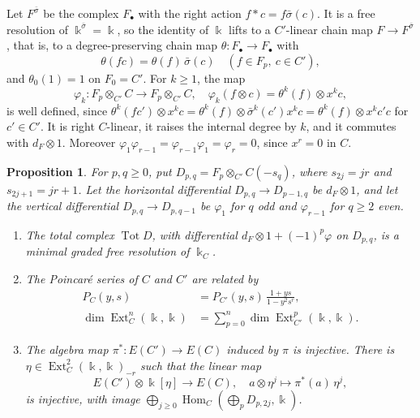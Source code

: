 \documentclass[reqno]{amsart}
\numberwithin{equation}{section}
\newtheorem{proposition}[equation]{Proposition}
\theoremstyle{definition}
\theoremstyle{remark}
\theoremstyle{plain}
\newcommand{\kk}{\Bbbk}
\DeclareMathOperator{\Ext}{Ext}
\DeclareMathOperator{\Hom}{Hom}
\DeclareMathOperator{\Tot}{Tot}
\begin{document}
Let $F^{\bar\sigma}$ be the complex $F_\bullet$ with the right action $f\ast c=f\bar\sigma(c)$. It is a free resolution of $\kk^{\bar\sigma}=\kk$, so the identity of $\kk$ lifts to a $C'$-linear chain map $F\to F^{\bar\sigma}$, that is, to a degree-preserving chain map $\theta\colon F_\bullet\to F_\bullet$ with
\begin{equation}\label{YAMe5Tr2}
\theta(fc)=\theta(f)\,\bar\sigma(c)\quad(f\in F_p,\ c\in C'),
\end{equation}
and $\theta_0(1)=1$ on $F_0=C'$. For $k\ge1$, the map
\[
\varphi_k\colon F_p\otimes_{C'}C\to F_p\otimes_{C'}C,\quad\varphi_k(f\otimes c)=\theta^k(f)\otimes x^kc,
\]
is well defined, since $\theta^k(fc')\otimes x^kc=\theta^k(f)\otimes\bar\sigma^k(c')x^kc=\theta^k(f)\otimes x^kc'c$ for $c'\in C'$. It is right $C$-linear, it raises the internal degree by $k$, and it commutes with $d_F\otimes1$. Moreover $\varphi_1\varphi_{r-1}=\varphi_{r-1}\varphi_1=\varphi_r=0$, since $x^r=0$ in $C$.

\begin{proposition}\label{YAMp3Tr7}
For $p,q\ge0$, put $D_{p,q}=F_p\otimes_{C'}C(-s_q)$, where $s_{2j}=jr$ and $s_{2j+1}=jr+1$. Let the horizontal differential $D_{p,q}\to D_{p-1,q}$ be $d_F\otimes1$, and let the vertical differential $D_{p,q}\to D_{p,q-1}$ be $\varphi_1$ for $q$ odd and $\varphi_{r-1}$ for $q\ge2$ even.
\begin{enumerate}
\item The total complex $\Tot D$, with differential $d_F\otimes1+(-1)^p\varphi$ on $D_{p,q}$, is a minimal graded free resolution of $\kk_C$.
\item The Poincar\'e series of $C$ and $C'$ are related by
\begin{equation}\label{YAMe5Tr4}
\begin{aligned}
P_C(y,s)&=P_{C'}(y,s)\,\frac{1+ys}{1-y^2s^r},\\
\dim\Ext^n_C(\kk,\kk)&=\sum_{p=0}^n\dim\Ext^p_{C'}(\kk,\kk).
\end{aligned}
\end{equation}
\item The algebra map $\pi^*\colon E(C')\to E(C)$ induced by $\pi$ is injective. There is $\eta\in\Ext^2_C(\kk,\kk)_{-r}$ such that the linear map
\[
E(C')\otimes\kk[\eta]\to E(C),\quad a\otimes\eta^j\mapsto\pi^*(a)\,\eta^j,
\]
is injective, with image $\bigoplus_{j\ge0}\Hom_C(\bigoplus_pD_{p,2j},\kk)$.
\end{enumerate}
\end{proposition}
\end{document}
